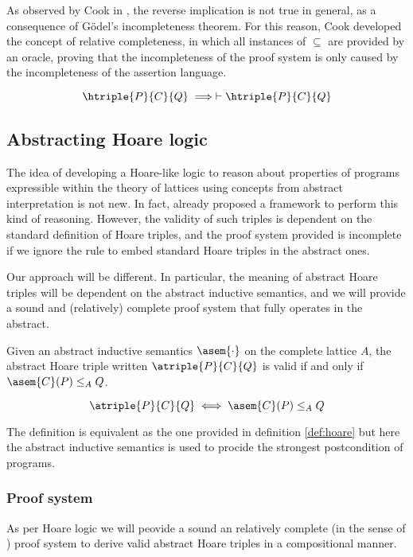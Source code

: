 As observed by Cook in \cite{Cook78}, the reverse implication is not true in 
general, as a consequence of Gödel's incompleteness theorem. For this reason, 
Cook developed the concept of relative completeness, in which all instances of 
$\subseteq$ are provided by an oracle, proving that the incompleteness of the 
proof system is only caused by the incompleteness of the assertion language.

\begin{theorem}
  \label{thm:hlogic-complete}
  $$\htriple{P}{C}{Q} \implies \vdash \htriple{P}{C}{Q}$$
\end{theorem}

\subsection{Abstracting Hoare logic}
The idea of developing a Hoare-like logic to reason about properties of 
programs expressible within the theory of lattices using concepts from abstract 
interpretation is not new. In fact, \cite{Cousot12} already proposed a framework 
to perform this kind of reasoning. However, the validity of such triples is 
dependent on the standard definition of Hoare triples, and the proof system 
provided is incomplete if we ignore the rule to embed standard Hoare triples 
in the abstract ones.

Our approach will be different. In particular, the meaning of abstract Hoare 
triples will be dependent on the abstract inductive semantics, and we will 
provide a sound and (relatively) complete proof system that fully operates in 
the abstract.

\begin{definition}
  \label{def:aht}
  Given an abstract inductive semantics $\asem{\cdot}$ on the complete lattice
  $A$, the abstract Hoare triple written $\atriple{P}{C}{Q}$ is valid if
  and only if $\asem{C}(P) \leq_A Q$.

  $$\atriple{P}{C}{Q} \iff \asem{C}(P) \leq_A Q$$
\end{definition}

The definition is equivalent as the one provided in definition \ref{def:hoare} 
but here the abstract inductive semantics is used to procide the strongest 
postcondition of programs.

\subsubsection{Proof system}
As per Hoare logic we will peovide a sound an relatively complete (in the sense
of \cite{Cook78}) proof system to derive valid abstract Hoare triples in a 
compositional manner.

